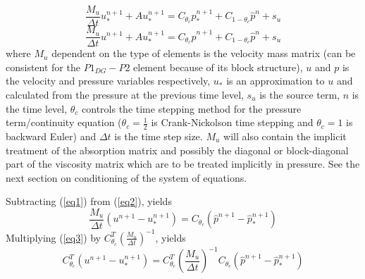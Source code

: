 \begin{equation}
\frac{M_u}{\Delta t}u_*^{n+1}+Au_*^{n+1}=  C_{\theta_c} {\hat p}_*^{n+1}
+C_{1-\theta_c} {\hat p}^n+s_u
\label{eq1}
\end{equation}
\begin{equation}
\frac{M_u}{\Delta t}u^{n+1}+Au_*^{n+1}=C_{\theta_c} {\hat p}^{n+1}
+C_{1-\theta_c} {\hat p}^n+s_u
\label{eq2}
\end{equation}
where $M_u$ dependent on the type of elements is the velocity mass matrix (can be consistent 
for the $P1_{DG}-P2$ element because of its block structure), 
$u$ and $p$ is the velocity and pressure variables respectively, 
$u_*$ is an approximation to $u$ and calculated from the 
pressure at the previous time level, 
$s_u$ is the source term, $n$ is the time level, $\theta_c$ controls 
the time stepping method for the pressure term/continuity equation 
($\theta_c=\frac{1}{2}$ is Crank-Nickolson time stepping and 
$\theta_c=1$ is backward Euler) 
and $\Delta t$ is the time step size. $M_u$ will also contain the 
implicit treatment of the absorption matrix and possibly the diagonal or block-diagonal 
part of 
the viscosity matrix which are to be treated implicitly in pressure. See 
the next section on conditioning of the system of equations. 

\noindent Subtracting (\ref{eq1}) from (\ref{eq2}), yields
\begin{equation}
\frac{M_u}{\Delta t}(u^{n+1}-u_*^{n+1})= C_{\theta_c} ({\hat p}^{n+1}-{\hat p}_*^{n+1})
\label{u-eqn}
\end{equation}
\noindent Multiplying (\ref{eq3}) by $C_{\theta_c}^T (\frac{M_u}{\Delta t})^{-1}$, yields
\begin{equation}
C_{\theta_c}^T (u^{n+1}-u_*^{n+1})=
C_{\theta_c}^T \left(\frac{M_u}{\Delta t}\right)^{-1} 
C_{\theta_c} ({\hat p}^{n+1}-{\hat p}_*^{n+1})
\label{eq3}
\end{equation}

